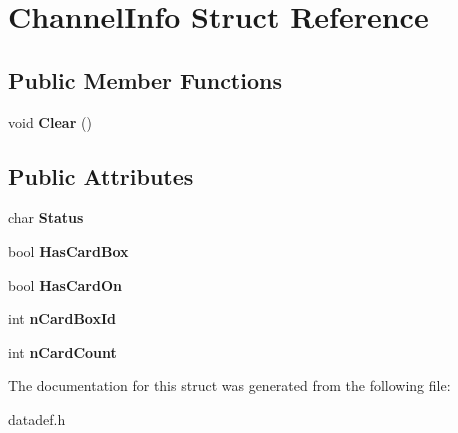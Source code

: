 \hypertarget{struct_channel_info}{\section{Channel\-Info Struct Reference}
\label{struct_channel_info}
}
\subsection*{Public Member Functions}
\begin{DoxyCompactItemize}
\item 
\hypertarget{struct_channel_info_ae58f861960f7c1280cd616471524a2e1}{void {\bfseries Clear} ()}\label{struct_channel_info_ae58f861960f7c1280cd616471524a2e1}

\end{DoxyCompactItemize}
\subsection*{Public Attributes}
\begin{DoxyCompactItemize}
\item 
\hypertarget{struct_channel_info_aedacf981c9eb4ab76650297e090bf891}{char {\bfseries Status}}\label{struct_channel_info_aedacf981c9eb4ab76650297e090bf891}

\item 
\hypertarget{struct_channel_info_a59a3c12fab986a526109ca081629af71}{bool {\bfseries Has\-Card\-Box}}\label{struct_channel_info_a59a3c12fab986a526109ca081629af71}

\item 
\hypertarget{struct_channel_info_a06784246856340ef1e48d7489a468dc3}{bool {\bfseries Has\-Card\-On}}\label{struct_channel_info_a06784246856340ef1e48d7489a468dc3}

\item 
\hypertarget{struct_channel_info_a3067ec797e6611da35ea6f00cafaf4e0}{int {\bfseries n\-Card\-Box\-Id}}\label{struct_channel_info_a3067ec797e6611da35ea6f00cafaf4e0}

\item 
\hypertarget{struct_channel_info_a3383067b2f6d412cd04b7929d3655139}{int {\bfseries n\-Card\-Count}}\label{struct_channel_info_a3383067b2f6d412cd04b7929d3655139}

\end{DoxyCompactItemize}


The documentation for this struct was generated from the following file\-:\begin{DoxyCompactItemize}
\item 
datadef.\-h\end{DoxyCompactItemize}

